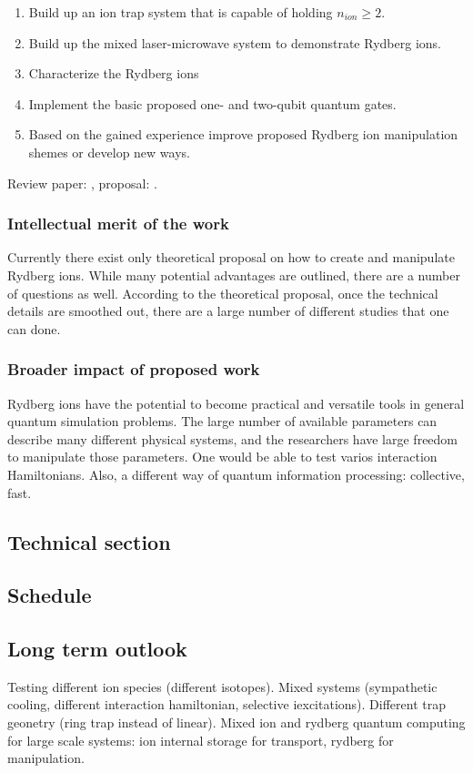 \begin{enumerate}
 \item Build up an ion trap system that is capable of holding $n_{ion} \ge 2$.
 \item Build up the mixed laser-microwave system to demonstrate Rydberg ions.
 \item Characterize the Rydberg ions
 \item Implement the basic proposed one- and two-qubit quantum gates.
 \item Based on the gained experience improve proposed Rydberg ion manipulation shemes or develop new ways.
\end{enumerate}

Review paper: \cite{Saffman2010}, proposal: \cite{Mueller2008}.

\subsubsection{Intellectual merit of the work}

Currently there exist only theoretical proposal on how to create and manipulate Rydberg ions. While many potential advantages are outlined, there are a number of questions as well. According to the theoretical proposal, once the technical details are smoothed out, there are a large number of different studies that one can done.

\subsubsection{Broader impact of proposed work}

Rydberg ions have the potential to become practical and versatile tools in general quantum simulation problems. The large number of available parameters can describe many different physical systems, and the researchers have large freedom to manipulate those parameters. One would be able to test varios interaction Hamiltonians. Also, a different way of quantum information processing: collective, fast.

\subsection{Technical section}

\subsection{Schedule}

\subsection{Long term outlook}

Testing different ion species (different isotopes). Mixed systems (sympathetic cooling, different interaction hamiltonian, selective iexcitations). Different trap geonetry (ring trap instead of linear). Mixed ion and rydberg quantum computing for large scale systems: ion internal storage for transport, rydberg for manipulation.
